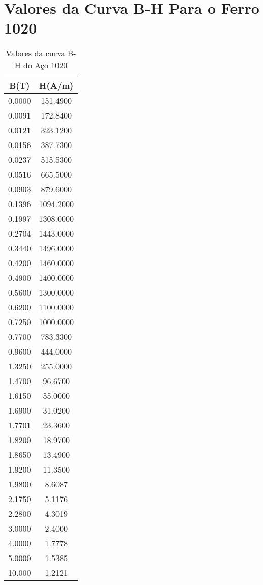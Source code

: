 \section{Valores da Curva B-H Para o Ferro 1020}

\begin{table}[ht!]
	\centering
	\begin{tabular}{ c c }
	B(T) & H(A/m) \\
	\hline \hline
	0.0000  &  151.4900\\
	0.0091  &  172.8400\\
	0.0121  &  323.1200\\
	0.0156  &  387.7300\\
	0.0237  &  515.5300\\
	0.0516  &  665.5000\\
	0.0903  &  879.6000\\
	0.1396  & 1094.2000\\
	0.1997  & 1308.0000\\
	0.2704  & 1443.0000\\
	0.3440  & 1496.0000\\
	0.4200  & 1460.0000\\
	0.4900  & 1400.0000\\
	0.5600  & 1300.0000\\
	0.6200  & 1100.0000\\
	0.7250  & 1000.0000\\
	0.7700  &  783.3300\\
	0.9600  &  444.0000\\
	1.3250  &  255.0000\\
	1.4700  &   96.6700\\
	1.6150  &   55.0000\\
	1.6900  &   31.0200\\
	1.7701  &   23.3600\\
	1.8200  &   18.9700\\
	1.8650  &   13.4900\\
	1.9200  &   11.3500\\
	1.9800  &    8.6087\\
	2.1750  &    5.1176\\
	2.2800  &    4.3019\\
	3.0000  &    2.4000\\
	4.0000  &    1.7778\\
	5.0000  &    1.5385\\
	10.000  &   1.2121 
	\end{tabular} 
	\caption{Valores da curva B-H do Aço 1020}
	\label{tab:apendices:ferro1020}
\end{table}
